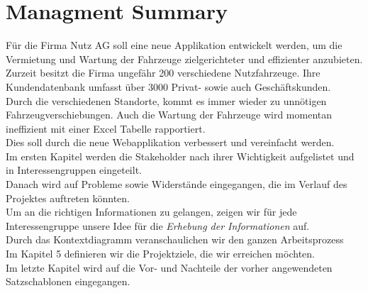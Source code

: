 \section{Managment Summary}
Für die Firma Nutz AG soll eine neue Applikation entwickelt werden, um die Vermietung und Wartung der Fahrzeuge zielgerichteter und effizienter anzubieten.\\
Zurzeit besitzt die Firma ungefähr 200 verschiedene Nutzfahrzeuge. Ihre Kundendatenbank umfasst über 3000 Privat- sowie auch Geschäftskunden.\\
Durch die verschiedenen Standorte, kommt es immer wieder zu unnötigen Fahrzeugverschiebungen. Auch die Wartung der Fahrzeuge wird momentan ineffizient mit einer Excel Tabelle rapportiert.\\[2ex]
%
Dies soll durch die neue Webapplikation verbessert und vereinfacht werden.\\
%
Im ersten Kapitel werden die Stakeholder nach ihrer Wichtigkeit aufgelistet und in Interessengruppen eingeteilt.\\
Danach wird auf Probleme sowie Widerstände eingegangen, die im Verlauf des Projektes auftreten könnten.\\
Um an die richtigen Informationen zu gelangen, zeigen wir für jede Interessengruppe unsere Idee für die \textit{Erhebung der Informationen} auf.\\
Durch das Kontextdiagramm veranschaulichen wir den ganzen Arbeitsprozess\\
Im Kapitel 5 definieren wir die Projektziele, die wir erreichen möchten.\\
Im letzte Kapitel wird auf die Vor- und Nachteile der vorher angewendeten Satzschablonen eingegangen.
